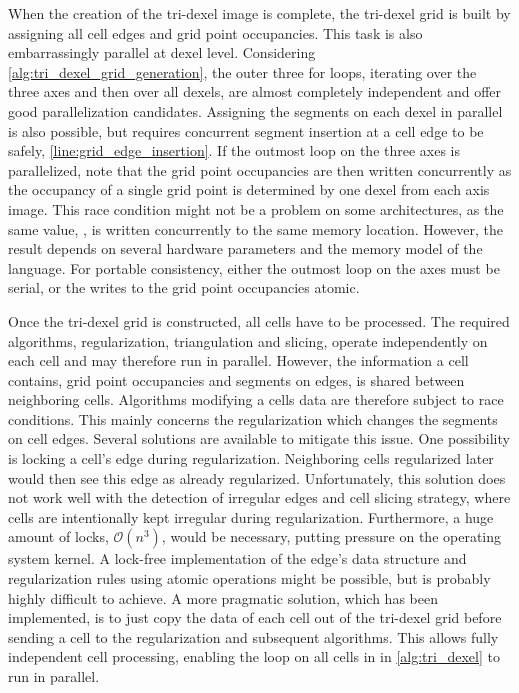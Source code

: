 When the creation of the tri-dexel image is complete, the tri-dexel grid is built by assigning all cell edges and grid point occupancies.
This task is also embarrassingly parallel at dexel level.
Considering \cref{alg:tri_dexel_grid_generation}, the outer three for loops, iterating over the three axes and then over all dexels, are almost completely independent and offer good parallelization candidates.
Assigning the segments on each dexel in parallel is also possible, but requires concurrent segment insertion at a cell edge to be safely, \cf \cref{line:grid_edge_insertion}.
If the outmost loop on the three axes is parallelized, note that the grid point occupancies are then written concurrently as the occupancy of a single grid point is determined by one dexel from each axis image.
This race condition might not be a problem on some architectures, as the same value, \True, is written concurrently to the same memory location.
However, the result depends on several hardware parameters and the memory model of the language.
For portable consistency, either the outmost loop on the axes must be serial, or the writes to the grid point occupancies atomic.

Once the tri-dexel grid is constructed, all cells have to be processed.
The required algorithms, \ie regularization, triangulation and slicing, operate independently on each cell and may therefore run in parallel.
However, the information a cell contains, \ie grid point occupancies and segments on edges, is shared between neighboring cells.
Algorithms modifying a cells data are therefore subject to race conditions.
This mainly concerns the regularization which changes the segments on cell edges.
Several solutions are available to mitigate this issue.
One possibility is locking a cell's edge during regularization.
Neighboring cells regularized later would then see this edge as already regularized.
Unfortunately, this solution does not work well with the detection of irregular edges and cell slicing strategy, where cells are intentionally kept irregular during regularization.
Furthermore, a huge amount of locks, $\mathcal{O}(n^3)$, would be necessary, putting pressure on the operating system kernel.
A lock-free implementation of the edge's data structure and regularization rules using atomic operations might be possible, but is probably highly difficult to achieve.
A more pragmatic solution, which has been implemented, is to just copy the data of each cell out of the tri-dexel grid before sending a cell to the regularization and subsequent algorithms.
This allows fully independent cell processing, enabling the loop on all cells in  in \cref{alg:tri_dexel} to run in parallel.

